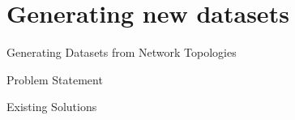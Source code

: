 \section{Generating new datasets}

\begin{frame}{Generating Datasets from Network Topologies}
\end{frame}
\begin{frame}{Problem Statement}
\end{frame}
\begin{frame}{Existing Solutions}
\end{frame}